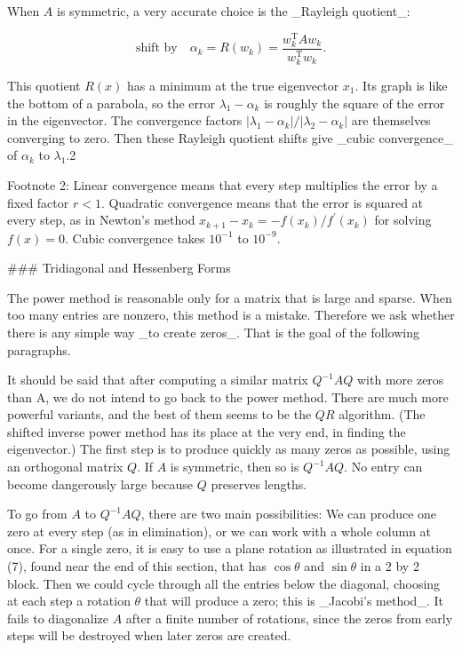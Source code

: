 When \(A\) is symmetric, a very accurate choice is the _Rayleigh quotient_:

\[\text{shift by}\quad\alpha_{k}=R(w_{k})=\frac{w_{k}^{\text{T}}Aw_{k}}{w_{k}^{ \text{T}}w_{k}}.\]

This quotient \(R(x)\) has a minimum at the true eigenvector \(x_{1}\). Its graph is like the bottom of a parabola, so the error \(\lambda_{1}-\alpha_{k}\) is roughly the square of the error in the eigenvector. The convergence factors \(|\lambda_{1}-\alpha_{k}|/|\lambda_{2}-\alpha_{k}|\) are themselves converging to zero. Then these Rayleigh quotient shifts give _cubic convergence_ of \(\alpha_{k}\) to \(\lambda_{1}\).2

Footnote 2: Linear convergence means that every step multiplies the error by a fixed factor \(r<1\). Quadratic convergence means that the error is squared at every step, as in Newton’s method \(x_{k+1}-x_{k}=-f(x_{k})/f^{\prime}(x_{k})\) for solving \(f(x)=0\). Cubic convergence takes \(10^{-1}\) to \(10^{-9}\).

### Tridiagonal and Hessenberg Forms

The power method is reasonable only for a matrix that is large and sparse. When too many entries are nonzero, this method is a mistake. Therefore we ask whether there is any simple way _to create zeros_. That is the goal of the following paragraphs.

It should be said that after computing a similar matrix \(Q^{-1}AQ\) with more zeros than A, we do not intend to go back to the power method. There are much more powerful variants, and the best of them seems to be the \(QR\) algorithm. (The shifted inverse power method has its place at the very end, in finding the eigenvector.) The first step is to produce quickly as many zeros as possible, using an orthogonal matrix \(Q\). If \(A\) is symmetric, then so is \(Q^{-1}AQ\). No entry can become dangerously large because \(Q\) preserves lengths.

To go from \(A\) to \(Q^{-1}AQ\), there are two main possibilities: We can produce one zero at every step (as in elimination), or we can work with a whole column at once. For a single zero, it is easy to use a plane rotation as illustrated in equation (7), found near the end of this section, that has \(\cos\theta\) and \(\sin\theta\) in a 2 by 2 block. Then we could cycle through all the entries below the diagonal, choosing at each step a rotation \(\theta\) that will produce a zero; this is _Jacobi's method_. It fails to diagonalize \(A\) after a finite number of rotations, since the zeros from early steps will be destroyed when later zeros are created.

